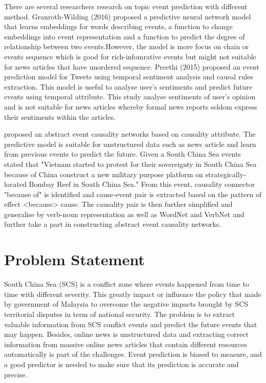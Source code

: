 \documentclass[twoside]{utmthesis}
\begin{document}
There are several researchers research on topic event prediction with different method. Granroth-Wilding (2016) proposed a predictive neural network model that learns embeddings for words describing events, a function to change embeddings into event representation and a function to predict the degree of relationship between two events.However, the model is more focus on chain or events sequence which is good for rich-infomrative events but might not suitable for news articles that have unordered sequence. Preethi (2015) proposed an event prediction model for Tweets using temporal sentiment analysis and causal rules extraction. This model is useful to analyse user's sentiments and predict future events using temporal attribute. This study analyse sentiments of user's opinion and is not suitable for news articles whereby formal news reports seldom express their sentiments within the articles. 

\cite{zhao2017constructing} proposed an abstract event causality networks based on causality attribute. The predictive model is suitable for unstructured data such as news article and learn from previous events to predict the future. Given a South China Sea events stated that "Vietnam started to protest for their sovereignty in South China Sea because of China construct a new military purpose platform on strategically-located Bombay Reef in South China Sea." From this event, causality connector "because of" is identified and cause-event pair is extracted based on the pattern of effect <because> cause. The causality pair is then further simplified and generalise by verb-noun representation as well as WordNet and VerbNet and further take a part in constructing abstract event causality networks. 


\section{Problem Statement}
South China Sea (SCS) is a conflict zone where events happened from time to time with different severity. This greatly impact or influence the policy that made by government of Malaysia to overcome the negative impacts brought by SCS territorial disputes in term of national security. The problem is to extract valuable information from SCS conflict events and predict the future events that may happen. Besides, online news is unstructured data and extracting correct information from massive online news articles that contain different resources automatically is part of the challenges. Event prediction is biased to measure, and a good predictor is needed to make sure that its prediction is accurate and precise.    
\end{document}
